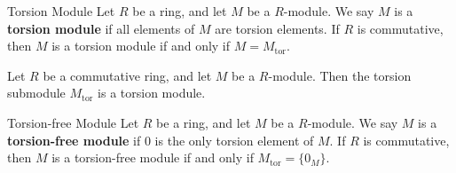 \begin{definition}{Torsion Module}{}
    Let $R$ be a ring, and let $M$ be a $R$-module. We say $M$ is a \textbf{torsion module} if all elements of $M$ are torsion elements. If $R$ is commutative, then $M$ is a torsion module if and only if $M=M_{\mathrm{tor}}$.
\end{definition}

\begin{example}{}{}
    Let $R$ be a commutative ring, and let $M$ be a $R$-module. Then the torsion submodule $M_{\mathrm{tor}}$ is a torsion module.
\end{example}


\begin{definition}{Torsion-free Module}{}
    Let $R$ be a ring, and let $M$ be a $R$-module. We say $M$ is a \textbf{torsion-free module} if $0$ is the only torsion element of $M$. If $R$ is commutative, then $M$ is a torsion-free module if and only if $M_{\mathrm{tor}}=\{0_M\}$.
\end{definition}

